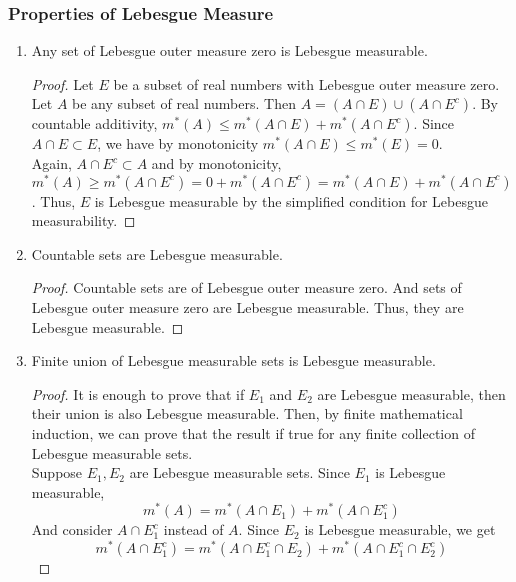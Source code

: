 \subsubsection{Properties of Lebesgue Measure}
\begin{enumerate}
	\item Any set of Lebesgue outer measure zero is Lebesgue measurable.
	\begin{proof}
		Let $E$ be a subset of real numbers with Lebesgue outer measure zero.
		Let $A$ be any subset of real numbers.
		Then $A = (A \cap E) \cup (A \cap E^c)$.
		By countable additivity, $m^\ast(A) \le m^\ast(A \cap E) + m^\ast(A \cap E^c)$.
		Since $A\cap E \subset E$, we have by monotonicity $m^\ast(A \cap E) \le m^\ast(E) = 0$.\\


		Again, $A \cap E^c \subset A$ and by monotonicity, $m^\ast(A) \ge m^\ast(A \cap E^c) = 0+m^\ast(A \cap E^c) = m^\ast(A\cap E) + m^\ast(A \cap E^c)$.
		Thus, $E$ is Lebesgue measurable by the simplified condition for Lebesgue measurability.
	\end{proof}

	\item Countable sets are Lebesgue measurable.
	\begin{proof}
	Countable sets are of Lebesgue outer measure zero.
	And sets of Lebesgue outer measure zero are Lebesgue measurable.
	Thus, they are Lebesgue measurable.
	\end{proof}
	\item Finite union of Lebesgue measurable sets is Lebesgue measurable.
		\label{thm:finiteunionmeasurable}
	\begin{proof}
		It is enough to prove that if $E_1$ and $E_2$ are Lebesgue measurable, then their union is also Lebesgue measurable.
		Then, by finite mathematical induction, we can prove that the result if true for any finite collection of Lebesgue measurable sets.\\


	Suppose $E_1, E_2$ are Lebesgue measurable sets.
	Since $E_1$ is Lebesgue measurable,
	\begin{equation}
		m^\ast(A) = m^\ast(A \cap E_1) + m^\ast(A \cap E_1^c)
	\end{equation}
	And consider $A \cap E_1^c$ instead of $A$.
	Since $E_2$ is Lebesgue measurable, we get
	\begin{equation}
		m^\ast(A \cap E_1^c) = m^\ast(A \cap E_1^c\cap  E_2) + m^\ast(A \cap E_1^c \cap E_2^c)
	\end{equation}


\end{proof}
\end{enumerate}
